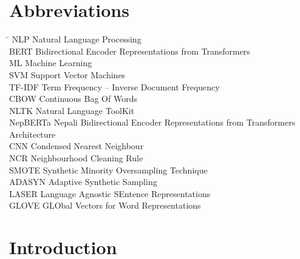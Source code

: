 \chapter*{Abbreviations}
\begin{tabbing}
\hspace{50mm}\=\kill
NLP \>	Natural Language Processing\\
BERT \>	Bidirectional Encoder Representations from Transformers \\
ML \>	Machine Learning\\
SVM\> Support Vector Machines\\
TF-IDF\> Term Frequency – Inverse Document Frequency\\
CBOW\> Continuous Bag Of Words\\
NLTK\> Natural Language ToolKit\\
NepBERTa \> Nepali Bidirectional Encoder Representations from Transformers Architecture \\
CNN \> Condensed Nearest Neighbour\\
NCR \> Neighbourhood Cleaning Rule \\
SMOTE \> Synthetic Minority Oversampling Technique \\
ADASYN \> Adaptive Synthetic Sampling \\
LASER \> Language Agnostic SEntence Representations\\
GLOVE \> GLObal Vectors for Word Representations\\
\end{tabbing}


















\newpage
{}

\chapter{Introduction}
\setcounter{figure}{0} %

